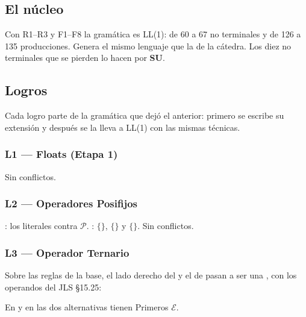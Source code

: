 \documentclass[12pt,a4paper]{article}
\newcommand{\cE}{\ensuremath{\mathcal{E}}}
\newcommand{\cP}{\ensuremath{\mathcal{P}}}
\newcommand{\cj}[1]{\ensuremath{\{}#1\ensuremath{\}}}
\newcommand{\tec}[1]{\textsf{\bfseries #1}}
\begin{document}
\subsection{El núcleo}

Con R1--R3 y F1--F8 la gramática es LL(1): de 60 a 67 no terminales y de 126 a 135 producciones.
Genera el mismo lenguaje que la de la cátedra. Los diez no terminales que se pierden lo hacen por
\tec{SU}.

\subsection{Logros}

Cada logro parte de la gramática que dejó el anterior: primero se escribe su extensión y después se
la lleva a LL(1) con las mismas técnicas.

\subsubsection*{L1 --- Floats (Etapa 1)}
\label{sec:l1}

\begin{producciones}
\end{producciones}
Sin conflictos.

\subsubsection*{L2 --- Operadores Posifijos}
\label{sec:l2}

\begin{producciones}
\end{producciones}
: los literales contra \cP. : \cj{\tl{++}}, \cj{\tl{-{}-}} y
\cj{\eps}. Sin conflictos.

\subsubsection*{L3 --- Operador Ternario}
\label{sec:l3}

 Sobre las reglas de la base, el lado derecho del \tl{=} y el de  pasan
a ser una , con los operandos del JLS §15.25:
\begin{producciones}
\end{producciones}
 En  y en  las dos alternativas tienen
Primeros \cE.
\end{document}
